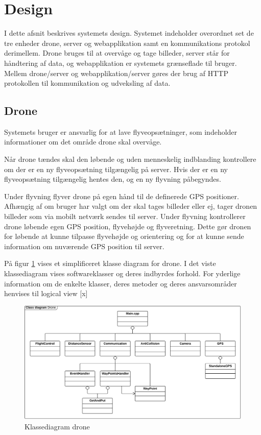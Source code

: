 \section{Design}

I dette afsnit beskrives systemets design. Systemet indeholder overordnet set de tre enheder drone, server og webapplikation samt en kommunikations protokol derimellem. Drone bruges til at overvåge og tage billeder, server står for håndtering af data, og webapplikation er systemets grænseflade til bruger. Mellem drone/server og webapplikation/server gøres der brug af HTTP protokollen til kommunikation og udveksling af data.



\subsection{Drone}

Systemets bruger er ansvarlig for at lave flyveopsætninger, som indeholder informationer om det område drone skal overvåge.

Når drone tændes skal den løbende og uden menneskelig indblanding kontrollere om der er en ny flyveopsætning tilgængelig på server. Hvis der er en ny flyveopsætning tilgængelig hentes den, og en ny flyvning påbegyndes. 

Under flyvning flyver drone på egen hånd til de definerede GPS positioner. Afhængig af om bruger har valgt om der skal tages billeder eller ej, tager dronen billeder som via mobilt netværk sendes til server. 
Under flyvning kontrollerer drone løbende egen GPS position, flyvehøjde og flyveretning. Dette gør dronen for løbende at kunne tilpasse flyvehøjde og orientering og for at kunne sende information om nuværende GPS position til server.

På figur \ref{fig:class_drone} vises et simplificeret klasse diagram for drone. I det viste klassediagram vises softwareklasser og deres indbyrdes forhold. For yderlige information om de enkelte klasser, deres metoder og deres ansvarsområder henvises til logical view [x]

\begin{figure}[H]
\centering
\includegraphics[width=1\textwidth]{Billeder/Design_Class_drone.png}
\vspace{-0.5cm}
\caption{Klassediagram drone}
\label{fig:class_drone}
\end{figure}


